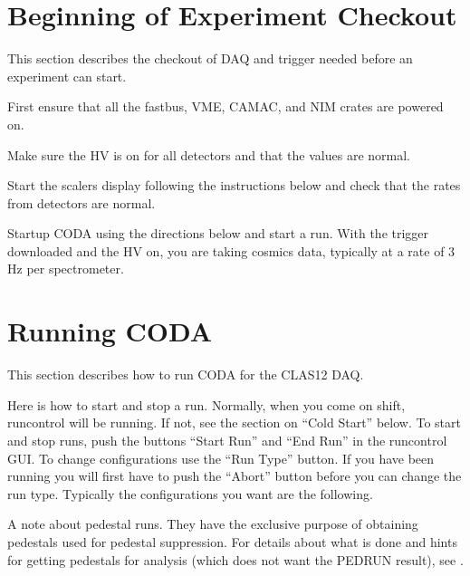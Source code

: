 {{\section{Beginning of Experiment Checkout}

\par
This section describes the 
checkout of DAQ and trigger
needed before an experiment can start.

\begin{enumerate}
\item{First ensure that all the fastbus, VME,
CAMAC, and NIM crates are powered
on. 

\item{Make sure the HV is on for all detectors
and that the values are normal.}

\item{Start the scalers}
display following the instructions below and
check that the rates from detectors are normal.}
 
\item{Startup CODA using the directions below
and start a run.  With the trigger downloaded
and the HV on, you are taking cosmics data, typically at 
a rate of 3 Hz per spectrometer. }

\end{enumerate}

\section{Running CODA}

\par
This section describes how to run CODA for
the CLAS12 DAQ.  


\par

Here is how to start and stop a run.
Normally, when you come on shift, 
runcontrol will be running.  If not,
see the section on ``Cold Start'' below.
To start and stop runs, push the buttons
``Start Run'' and ``End Run'' in the
runcontrol GUI.   To change configurations
use the ``Run Type'' button.  If you have
been running you will first have to push the
``Abort'' button before you can change the 
run type. Typically the configurations
you want are the following.

\par 
A note about pedestal runs.  They have the exclusive
purpose of obtaining pedestals used for pedestal
suppression.  For details about what is done
and hints for getting pedestals for analysis (which
does not want the PEDRUN result), see .

}}
